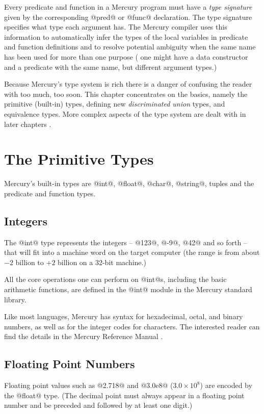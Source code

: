 Every predicate and function in a Mercury program must have a \emph{type
signature} given by the corresponding @pred@ or @func@ declaration.  The
type signature specifies what type each argument has.  The Mercury
compiler uses this information to automatically infer the types of the local
variables in predicate and function definitions and to resolve potential
ambiguity when the same name has been used for more than one purpose (\eg
one might have a data constructor and a predicate with the same name, but
different argument types.)

Because Mercury's type system is rich there is a danger of confusing the
reader with too much, too soon.  This chapter concentrates on the basics,
namely the primitive (built-in) types, defining new \emph{discriminated
union} types, and equivalence types.  More complex aspects of the type
system are dealt with in later chapters \XXX{}.

\section{The Primitive Types}

Mercury's built-in types are @int@, @float@, @char@, @string@, tuples and
the predicate and function types.

\subsection{Integers}

The @int@ type represents the integers -- @123@, @-9@, @42@ and so forth --
that will fit into a machine word on the target computer (the range is from
about $-2$ billion to $+2$ billion on a 32-bit machine.)

All the core operations one can perform on @int@s, including the basic
arithmetic functions, are defined in the @int@ module in the Mercury
standard library.

Like most languages, Mercury has syntax for hexadecimal, octal, and binary
numbers, as well as for the integer codes for characters.  The interested
reader can find the details in the Mercury Reference Manual \XXX{}.

\subsection{Floating Point Numbers}

Floating point values such as @2.718@ and @3.0e8@ ($3.0\times10^8$) are
encoded by the @float@ type.  (The decimal point must always
appear in a floating point number and be preceded and followed by at
least one digit.)

